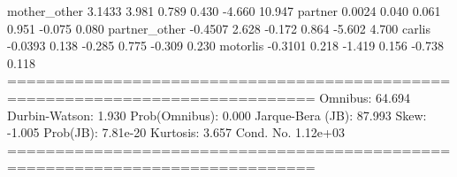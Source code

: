 mother_other           3.1433      3.981      0.789      0.430      -4.660      10.947
partner                0.0024      0.040      0.061      0.951      -0.075       0.080
partner_other         -0.4507      2.628     -0.172      0.864      -5.602       4.700
carlis                -0.0393      0.138     -0.285      0.775      -0.309       0.230
motorlis              -0.3101      0.218     -1.419      0.156      -0.738       0.118
==============================================================================
Omnibus:                       64.694   Durbin-Watson:                   1.930
Prob(Omnibus):                  0.000   Jarque-Bera (JB):               87.993
Skew:                          -1.005   Prob(JB):                     7.81e-20
Kurtosis:                       3.657   Cond. No.                     1.12e+03
==============================================================================

